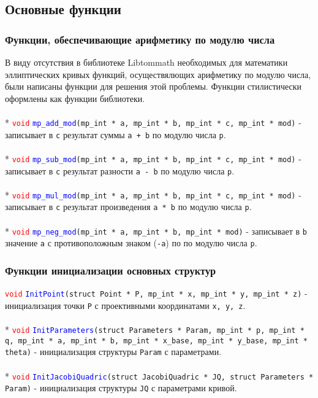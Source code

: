 \documentclass[12pt]{article}
\begin{document}
\subsection{Основные функции}
\subsubsection{Функции, обеспечивающие арифметику по модулю числа}
В виду отсутствия в библиотеке Libtommath необходимых для математики эллиптических кривых функций, осуществялющих арифметику по модулю числа, были написаны функции для решения этой проблемы. Функции стилистически оформлены как функции библиотеки.\\
\\*
\textcolor{red}{\texttt{void}} \textcolor{blue}{\texttt{mp\_add\_mod}}\texttt{(mp\_int * a, mp\_int * b, mp\_int * c, mp\_int * mod)} - записывает в \texttt{c} результат суммы \texttt{a + b} по модулю числа \texttt{p}.\\
\\*
\textcolor{red}{\texttt{void}} \textcolor{blue}{\texttt{mp\_sub\_mod}}\texttt{(mp\_int * a, mp\_int * b, mp\_int * c, mp\_int * mod)} - записывает в \texttt{c} результат разности \texttt{a - b} по модулю числа \texttt{p}.\\
\\*
\textcolor{red}{\texttt{void}} \textcolor{blue}{\texttt{mp\_mul\_mod}}\texttt{(mp\_int * a, mp\_int * b, mp\_int * c, mp\_int * mod)} - записывает в \texttt{c} результат произведения \texttt{a * b} по модулю числа \texttt{p}.\\
\\*
\textcolor{red}{\texttt{void}} \textcolor{blue}{\texttt{mp\_neg\_mod}}\texttt{(mp\_int * a, mp\_int * b, mp\_int * mod)} - записывает в \texttt{b} значение \texttt{a} с противоположным знаком (\texttt{-a}) по по модулю числа \texttt{p}.\\

\subsubsection{Функции инициализации основных структур}
\textcolor{red}{\texttt{void}} \textcolor{blue}{\texttt{InitPoint}}\texttt{(struct Point * P, mp\_int * x, mp\_int * y, mp\_int * z)} - инициализация точки \texttt{P} с проективными координатами \texttt{x, y, z}.\\
\\*
\textcolor{red}{\texttt{void}} \textcolor{blue}{\texttt{InitParameters}}\texttt{(struct Parameters * Param, mp\_int * p, mp\_int * q, mp\_int * a, mp\_int * b, mp\_int * x\_base, mp\_int * y\_base, mp\_int * theta)} - инициализация структуры \texttt{Param} с параметрами.\\
\\*
\textcolor{red}{\texttt{void}} \textcolor{blue}{\texttt{InitJacobiQuadric}}\texttt{(struct JacobiQuadric * JQ, struct Parameters * Param)} - инициализация структуры \texttt{JQ} с параметрами кривой.\\ 
\end{document}
